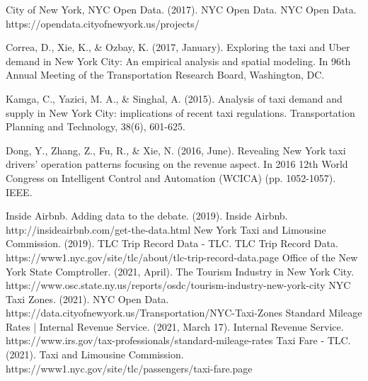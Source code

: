\documentclass[11pt]{article}
\begin{document}
\begin{thebibliography}{1}
\setlength{\parfillskip}{0pt plus 1fil}
City of New York, NYC Open Data. (2017). NYC Open Data. NYC Open Data.\\ https://opendata.cityofnewyork.us/projects/

Correa, D., Xie, K., \& Ozbay, K. (2017, January). Exploring the taxi and Uber demand in New York City: An empirical analysis and spatial modeling. In 96th Annual Meeting of the Transportation Research Board, Washington, DC.

Kamga, C., Yazici, M. A., \& Singhal, A. (2015). Analysis of taxi demand and supply in New York City: implications of recent taxi regulations. Transportation Planning and Technology, 38(6), 601-625.

Dong, Y., Zhang, Z., Fu, R., \& Xie, N. (2016, June). Revealing New York taxi drivers' operation patterns focusing on the revenue aspect. In 2016 12th World Congress on Intelligent Control and Automation (WCICA) (pp. 1052-1057). IEEE.

Inside Airbnb. Adding data to the debate. (2019). Inside Airbnb. http://insideairbnb.com/get-the-data.html
New York Taxi and Limousine Commission. (2019). TLC Trip Record Data - TLC. TLC Trip Record Data. https://www1.nyc.gov/site/tlc/about/tlc-trip-record-data.page
Office of the New York State Comptroller. (2021, April). The Tourism Industry in New York City. https://www.osc.state.ny.us/reports/osdc/tourism-industry-new-york-city
NYC Taxi Zones. (2021). NYC Open Data.
https://data.cityofnewyork.us/Transportation/NYC-Taxi-Zones
Standard Mileage Rates | Internal Revenue Service. (2021, March 17). Internal Revenue Service. https://www.irs.gov/tax-professionals/standard-mileage-rates
Taxi Fare - TLC. (2021). Taxi and Limousine Commission.
https://www1.nyc.gov/site/tlc/passengers/taxi-fare.page

\end{thebibliography}
\end{document}
